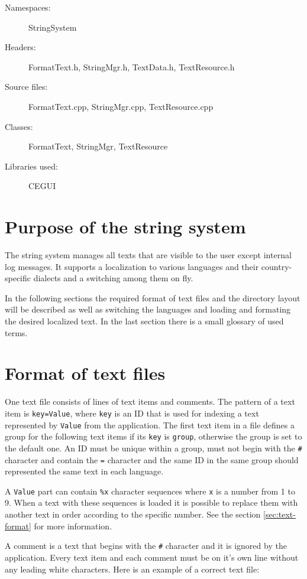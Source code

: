 \begin{description}
  \item[Namespaces:] StringSystem
  \item[Headers:] FormatText.h, StringMgr.h, TextData.h, TextResource.h
  \item[Source files:] FormatText.cpp, StringMgr.cpp, TextResource.cpp
  \item[Classes:] FormatText, StringMgr, TextResource
  \item[Libraries used:] CEGUI
\end{description}

\section{Purpose of the string system}

The string system manages all texts that are visible to the user except internal log messages. It supports a localization to various languages and their country-specific dialects and a switching among them on fly.

In the following sections the required format of text files and the directory layout will be described as well as switching the languages and loading and formating the desired localized text. In the last section there is a small glossary of used terms.

\section{Format of text files}

One text file consists of lines of text items and comments. The pattern of a text item is \verb/key=Value/, where \verb/key/ is an ID that is used for indexing a text represented by \verb/Value/ from the application. The first text item in a file defines a group for the following text items if its \verb/key/ is \verb/group/, otherwise the group is set to the default one. An ID must be unique within a group, must not begin with the \verb/#/ character and contain the \verb/=/ character and the same ID in the same group should represented the same text in each language.

A \verb/Value/ part can contain \verb/%x/ character sequences where \verb/x/ is a number from 1 to 9. When a text with these sequences is loaded it is possible to replace them with another text in order according to the specific number. See the section \ref{sec:text-format} for more information.

A comment is a text that begins with the \verb/#/ character and it is ignored by the application. Every text item and each comment must be on it's own line without any leading white characters. Here is an example of a correct text file:

